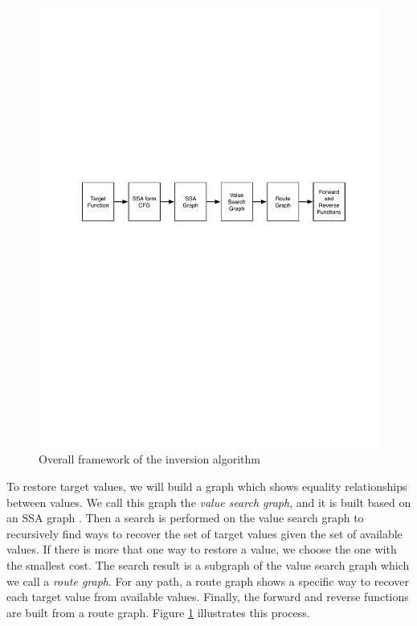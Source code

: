 \begin{figure}
\centering
\includegraphics[width=400pt]{figures1/Framework.pdf}
\caption{Overall framework of the inversion algorithm}
\label{fig:framework}
\end{figure}

To restore target values, we will build a graph which shows equality relationships between values. 
We call this graph the \emph{value search graph}, and it is built based on an SSA graph \cite{Alpern1988,Cooper2001}. 
Then a search is performed on the value search graph to recursively find ways to recover the set of target values given the set of available values. 
If there is more that one way to restore a value, we choose the one with the smallest cost. 
The search result is a subgraph of the value search graph which we call a \emph{route graph}. 
For any path, a route graph shows a specific way to recover each target value from available values. 
Finally, the forward and reverse functions are built from a route graph. 
Figure \ref{fig:framework} illustrates this process.

